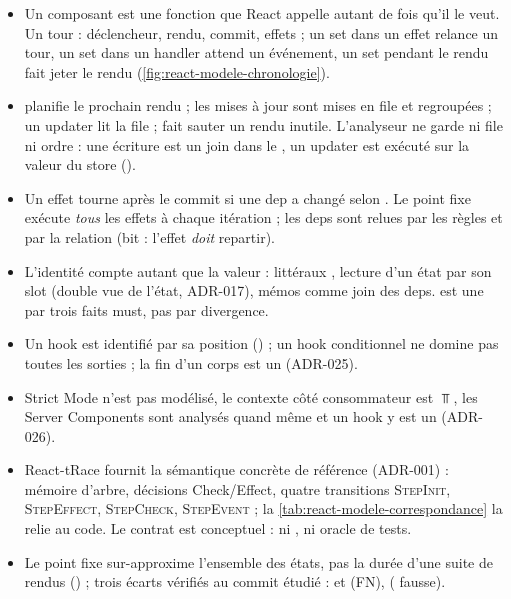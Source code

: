 \begin{resume}
\begin{itemize}
  \item Un composant est une fonction que React appelle autant de fois qu'il
    le veut. Un tour : déclencheur, rendu, commit, effets ; un set dans un
    effet relance un tour, un set dans un handler attend un événement, un set
    pendant le rendu fait jeter le rendu (\cref{fig:react-modele-chronologie}).
  \item {} planifie le prochain rendu ; les mises à jour sont mises en
    file et regroupées ; un updater lit la file ;  fait sauter
    un rendu inutile. L'analyseur ne garde ni file ni ordre : une écriture est
    un join dans le , un updater est exécuté sur la valeur du
    store ().
  \item Un effet tourne après le commit si une dep a changé selon
    . Le point fixe exécute \emph{tous} les effets à chaque
    itération ; les deps sont relues par les règles et par la relation
     (bit  : l'effet \emph{doit} repartir).
  \item L'identité compte autant que la valeur : littéraux ,
    lecture d'un état  par son slot (double vue de l'état,
    ADR-017), mémos comme join des deps.  est une \Error{} par
    trois faits must, pas par divergence.
  \item Un hook est identifié par sa position () ; un hook
    conditionnel ne domine pas toutes les sorties ; la fin d'un corps est un
     (ADR-025).
  \item Strict Mode n'est pas modélisé, le contexte côté consommateur est
    $\Top$, les Server Components sont analysés quand même et un hook y est un
    \Warning{} (ADR-026).
  \item React-tRace fournit la sémantique concrète de référence (ADR-001) :
    mémoire d'arbre, décisions \textsf{Check}/\textsf{Effect}, quatre
    transitions \textsc{StepInit}, \textsc{StepEffect}, \textsc{StepCheck},
    \textsc{StepEvent} ; la \cref{tab:react-modele-correspondance} la relie au
    code. Le contrat est conceptuel : ni , ni oracle de
    tests.
  \item Le point fixe sur-approxime l'ensemble des états, pas la durée d'une
    suite de rendus () ; trois écarts vérifiés au commit étudié :
     et  (FN),  (\Error{} fausse).

\end{itemize}
\end{resume}
